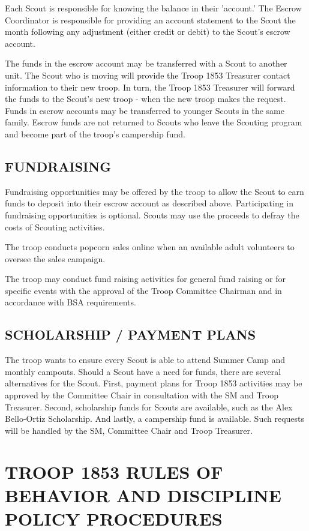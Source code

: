 \documentclass{ltxguide}
\begin{document}
Each Scout is responsible for knowing the balance in their 'account.' The Escrow Coordinator is responsible for providing an account statement to the Scout the month following any adjustment (either credit or debit) to the Scout's escrow account.

The funds in the escrow account may be transferred with a Scout to another unit. The Scout who is moving will provide the Troop 1853 Treasurer contact information to their new troop. In turn, the Troop 1853 Treasurer will forward the funds to the Scout's new troop - when the new troop makes the request. Funds in escrow accounts may be transferred to younger Scouts in the same family. Escrow funds are not returned to Scouts who leave the Scouting program and become part of the troop's campership fund.

\subsection{FUNDRAISING}
Fundraising opportunities may be offered by the troop to allow the Scout to earn funds to deposit into their escrow account as described above. Participating in fundraising opportunities is optional. Scouts may use the proceeds to defray the costs of Scouting activities.

The troop conducts popcorn sales online when an available adult volunteers to oversee the sales campaign. 

The troop may conduct fund raising activities for general fund raising or for specific events with the approval of the Troop Committee Chairman and in accordance with \ac{BSA} requirements.

\subsection{SCHOLARSHIP / PAYMENT PLANS}
The troop wants to ensure every Scout is able to attend Summer Camp and monthly campouts. Should a Scout have a need for funds, there are several alternatives for the Scout. First, payment plans for Troop 1853 activities may be approved by the Committee Chair in consultation with the \ac{SM} and Troop Treasurer. Second, scholarship funds for Scouts are available, such as the Alex Bello-Ortiz Scholarship. And lastly, a campership fund is available. Such requests will be handled by the \ac{SM}, Committee Chair and Troop Treasurer.

\section{TROOP 1853 RULES OF BEHAVIOR AND DISCIPLINE POLICY PROCEDURES}
\end{document}
